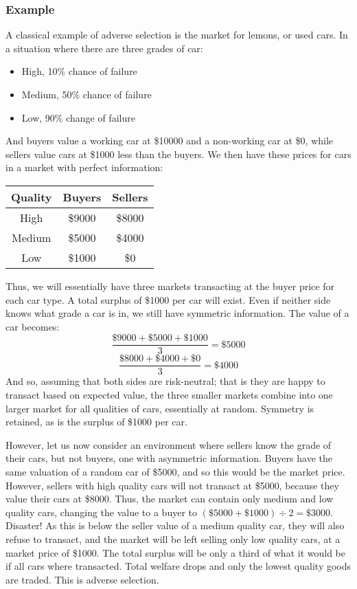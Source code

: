 \documentclass[12pt]{report}
\begin{document}
\subsubsection*{Example}
A classical example of adverse selection is the market for lemons, or used
cars. In a situation where there are three grades of car:
\begin{itemize}
    \item High, 10\% chance of failure
    \item Medium, 50\% chance of failure
    \item Low, 90\% change of failure
\end{itemize}
And buyers value a working car at \$10000 and a non-working car at \$0, while
sellers value cars at \$1000 less than the buyers. We then have these prices
for cars in a market with perfect information:
\begin{center}
    \begin{tabular}{|c|c|c|}
        \hline
        Quality & Buyers & Sellers \\
        \hline
        \hline
        High & \$9000 & \$8000 \\
        Medium & \$5000 & \$4000 \\
        Low & \$1000 & \$0 \\
        \hline
    \end{tabular}
\end{center}
Thus, we will essentially have three markets transacting at the buyer price
for each car type. A total surplus of \$1000 per car will exist. Even if
neither side knows what grade a car is in, we still have symmetric information.
The value of a car becomes:
\[\frac{\$9000 + \$5000 + \$1000}{3} = \$5000\]
\[\frac{\$8000 + \$4000 + \$0}{3} = \$4000\]
And so, assuming that both sides are risk-neutral; that is they are happy
to transact based on expected value, the three smaller markets combine into
one larger market for all qualities of cars, essentially at random. 
Symmetry is retained, as is the surplus of \$1000 per car.

\bigskip
However, let us now consider an environment where sellers know the grade of
their cars, but not buyers, one with asymmetric information. Buyers have the
same valuation of a random car of \$5000, and so this would be the market
price. However, sellers with high quality cars will not transact at \$5000,
because they value their cars at \$8000. Thus, the market can contain only
medium and low quality cars, changing the value to a buyer to
\((\$5000 + \$1000) \div 2 = \$3000\). Disaster! As this is below the seller
value of a medium quality car, they will also refuse to transact, and the
market will be left selling only low quality cars, at a market price of \$1000.
The total surplus will be only a third of what it would be if all cars where
transacted. Total welfare drops and only the lowest quality goods are traded.
This is adverse selection.
\end{document}
